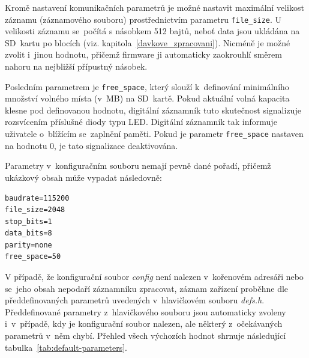 Kromě nastavení komunikačních parametrů je možné nastavit maximální velikost záznamu (záznamového souboru) prostřednictvím parametru \texttt{file\_size}. U velikosti záznamu se~počítá s násobkem 512 bajtů, neboť data jsou ukládána na SD~kartu po blocích (viz. kapitola~\ref{davkove_zpracovani}). Nicméně je možné zvolit i~jinou hodnotu, přičemž firmware ji automaticky zaokrouhlí směrem nahoru na nejbližší přípustný násobek. 

Posledním parametrem je \texttt{free\_space}, který slouží k~definování minimálního množství volného místa (v~MB) na SD~kartě. Pokud aktuální volná kapacita klesne pod definovanou hodnotu, digitální záznamník tuto skutečnost signalizuje rozsvícením příslušné diody typu LED. Digitální záznamník tak informuje uživatele o~blížícím se~zaplnění paměti. Pokud je parametr \texttt{free\_space} nastaven na hodnotu 0, je tato signalizace deaktivována.

Parametry v~konfiguračním souboru nemají pevně dané pořadí, přičemž ukázkový obsah může vypadat následovně:

\begin{verbatim}
baudrate=115200
file_size=2048
stop_bits=1
data_bits=8
parity=none
free_space=50
\end{verbatim}

V případě, že konfigurační soubor \textit{config} není nalezen v~kořenovém adresáři nebo se~jeho obsah nepodaří záznamníku zpracovat, záznam zařízení proběhne dle předdefinovaných parametrů uvedených v~hlavičkovém souboru \textit{defs.h}. Předdefinované parametry z~hlavičkového souboru jsou automaticky zvoleny i~v~případě, kdy je konfigurační soubor nalezen, ale některý z~očekávaných parametrů v~něm chybí. Přehled všech výchozích hodnot shrnuje následující tabulka~\ref{tab:default-parameters}.

